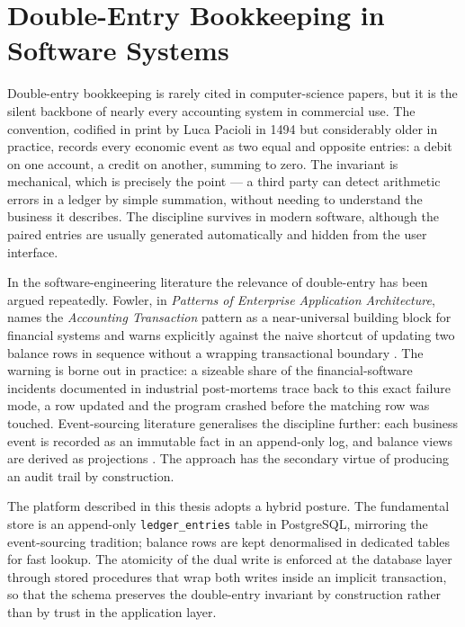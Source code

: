 \section{Double-Entry Bookkeeping in Software Systems}
\label{sec:doubleentry}

Double-entry bookkeeping is rarely cited in computer-science papers, but it is the silent backbone of nearly every accounting system in commercial use. The convention, codified in print by Luca Pacioli in 1494 \cite{pacioli1494} but considerably older in practice, records every economic event as two equal and opposite entries: a debit on one account, a credit on another, summing to zero. The invariant is mechanical, which is precisely the point --- a third party can detect arithmetic errors in a ledger by simple summation, without needing to understand the business it describes. The discipline survives in modern software, although the paired entries are usually generated automatically and hidden from the user interface.

In the software-engineering literature the relevance of double-entry has been argued repeatedly. Fowler, in \emph{Patterns of Enterprise Application Architecture}, names the \emph{Accounting Transaction} pattern as a near-universal building block for financial systems and warns explicitly against the naive shortcut of updating two balance rows in sequence without a wrapping transactional boundary \cite{fowler2002}. The warning is borne out in practice: a sizeable share of the financial-software incidents documented in industrial post-mortems trace back to this exact failure mode, a row updated and the program crashed before the matching row was touched. Event-sourcing literature generalises the discipline further: each business event is recorded as an immutable fact in an append-only log, and balance views are derived as projections \cite{wesner2018,fowler2017event}. The approach has the secondary virtue of producing an audit trail by construction.

The platform described in this thesis adopts a hybrid posture. The fundamental store is an append-only \texttt{ledger\_entries} table in PostgreSQL, mirroring the event-sourcing tradition; balance rows are kept denormalised in dedicated tables for fast lookup. The atomicity of the dual write is enforced at the database layer through stored procedures that wrap both writes inside an implicit transaction, so that the schema preserves the double-entry invariant by construction rather than by trust in the application layer.

